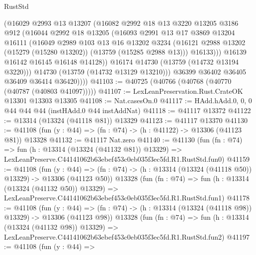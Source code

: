 \begin{lexlean}{RustStd}
\begin{coremodule}
                (@16029
                  @2993
                  @13
                  @13207
                  (@16082
                    @2992
                    @18
                    @13
                    @3220
                    @13205
                    @3186
                    @912
                    (@16044
                      @2992
                      @18
                      @13205
                      (@16093
                        @2991
                        @13
                        @17
                        @3869
                        @13204
                        @16111
                        (@16049
                          @2989
                          @103
                          @13
                          @16
                          @13202
                          @3234
                          (@16121 @2988 @13202 (@15279 (@15280 @13202)) (@13759 (@15285 @2988 @13)))
                          @16133)))
                    @16139
                    @16142
                    @16145
                    @16148
                    @14128))
                @16174
                @14730
                (@13759 (@14732 @13194 @3220)))
              @14730
              (@13759 (@14732 @13129 @13210)))
            @36399
            @36402
            @36405
            @36409
            @36414
            @36420))))
@41103 := @40725 (@40766 (@40768 (@40770 (@40787 (@40803 @41097)))))
@41107 := LexLeanPreservation.Rust.CrateOK @13301 @13303 @13305
@41108 := Nat.casesOn.{0}
@41117 := HAdd.hAdd.{0, 0, 0} @44 @44 @44 (instHAdd.{0} @44 instAddNat)
@41118 := @41117 @13372
@41122 := @13314 (@13324 (@41118 @81)) @13329
@41123 := @41117 @13370
@41130 := @41108 (fun (y : @44) => (fn : @74) -> (h : @41122) -> @13306 (@41123 @81)) @13328
@41132 := @41117 Nat.zero
@41140 := @41130
    (fun (fn : @74) =>
    fun (h : @13314 (@13324 (@41132 @81)) @13329) =>
    LexLeanPreserve.C44141062b63ebef453c0eb035f3ec5fd.R1.RustStd.fun0)
@41159 := @41108
    (fun (y : @44) =>
    (fn : @74) -> (h : @13314 (@13324 (@41118 @50)) @13329) -> @13306 (@41123 @50))
    @13328
    (fun (fn : @74) =>
    fun (h : @13314 (@13324 (@41132 @50)) @13329) =>
    LexLeanPreserve.C44141062b63ebef453c0eb035f3ec5fd.R1.RustStd.fun1)
@41178 := @41108
    (fun (y : @44) =>
    (fn : @74) -> (h : @13314 (@13324 (@41118 @98)) @13329) -> @13306 (@41123 @98))
    @13328
    (fun (fn : @74) =>
    fun (h : @13314 (@13324 (@41132 @98)) @13329) =>
    LexLeanPreserve.C44141062b63ebef453c0eb035f3ec5fd.R1.RustStd.fun2)
@41197 := @41108
    (fun (y : @44) =>

\end{coremodule}
\end{lexlean}
